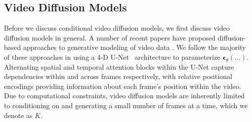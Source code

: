 \subsection{Video Diffusion Models}
Before we discuss conditional video diffusion models, we first discuss video diffusion models in general. A number of recent papers have proposed diffusion-based approaches to generative modeling of video data \citep{didrik, fdm, vdm, yang2022diffusion, voleti2022MCVD}. 
We follow the majority of these approaches \citep{fdm,vdm,voleti2022MCVD} in using a 4-D U-Net~\citep{unet} architecture to parameterize $\boldsymbol{\epsilon}_\theta(\ldots)$. 
Alternating spatial and temporal attention blocks within the U-Net capture dependencies within and across frames respectively, with relative positional encodings \citep{rpe1, rpe2} providing information about each frame's position within the video. 
Due to computational constraints, video diffusion models are inherently limited to conditioning on and generating a small number of frames at a time, which we denote as $K$. 

